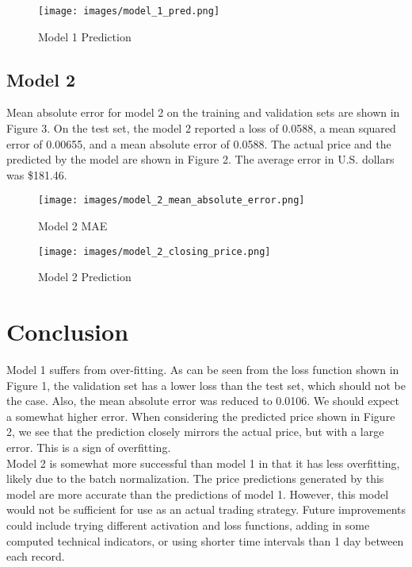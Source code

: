 \documentclass[acmtog, authorversion]{acmart}
\begin{document}
\begin{figure}[h]
\caption{Model 1 Prediction}
\texttt{[image: images/model\_1\_pred.png]}
\centering
\end{figure}

\subsection{Model 2}
Mean absolute error for model 2 on the training and validation sets are shown in Figure 3. On the test set, the model 2 reported a loss of 0.0588, a mean squared error of 0.00655, and a mean absolute error of 0.0588. The actual price and the predicted by the model are shown in Figure 2. The average error in U.S. dollars was \$181.46.

\begin{figure}[h]
\caption{Model 2 MAE}
\texttt{[image: images/model\_2\_mean\_absolute\_error.png]}
\centering
\end{figure}

\begin{figure}[h]
\caption{Model 2 Prediction}
\texttt{[image: images/model\_2\_closing\_price.png]}
\centering
\end{figure}

\section{Conclusion}
Model 1 suffers from over-fitting. As can be seen from the loss function shown in Figure 1, the validation set has a lower loss than the test set, which should not be the case. Also, the mean absolute error was reduced to 0.0106. We should expect a somewhat higher error. When considering the predicted price shown in Figure 2, we see that the prediction closely mirrors the actual price, but with a large error. This is a sign of overfitting. \\

Model 2 is somewhat more successful than model 1 in that it has less overfitting, likely due to the batch normalization. The price predictions generated by this model are more accurate than the predictions of model 1. However, this model would not be sufficient for use as an actual trading strategy. Future improvements could include trying different activation and loss functions, adding in some computed technical indicators, or using shorter time intervals than 1 day between each record.



\end{document}
